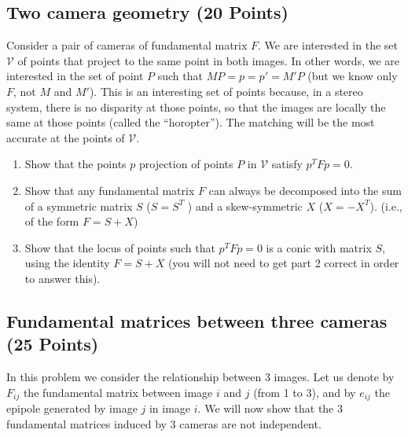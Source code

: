 \documentclass[11pt]{article}
\begin{document}
\subsection{Two camera geometry (20 Points)}
Consider a pair of cameras of fundamental matrix $F$. We are interested in
the set $\mathcal{V}$ of points that project to the same point in both images. In other
words, we are interested in the set of point $P$ such that $MP = p = p' = M'P$
(but we know only $F$, not $M$ and $M'$). This is an interesting set of points
because, in a stereo system, there is no disparity at those points, so that the
images are locally the same at those points (called the ``horopter''). The matching will be the most
accurate at the points of $\mathcal{V}$.
\begin{enumerate}
\item Show that the points $p$ projection of points $P$ in $\mathcal{V}$ satisfy $p^TFp = 0$.
\item Show that any fundamental matrix $F$ can always be decomposed into
the sum of a symmetric matrix $S$ ($S = S^T$ ) and a skew-symmetric $X$
($X = -X^T$). (i.e., of the form $F = S + X$)
\item Show that the locus of points such that $p^TFp = 0$ is a conic with
matrix $S$, using the identity $F = S + X$ (you will not need to get part 2 correct in order to answer this).
\end{enumerate}





\subsection{Fundamental matrices between three cameras (25 Points)}
In this problem we consider the relationship between $3$ images. Let us denote by $F_{ij}$ the fundamental matrix between image $i$ and $j$ (from 1 to 3), and by $e_{ij}$ the epipole generated by image $j$ in image $i$. We will now show that the $3$ fundamental matrices induced by $3$ cameras are not independent. 
\end{document}
